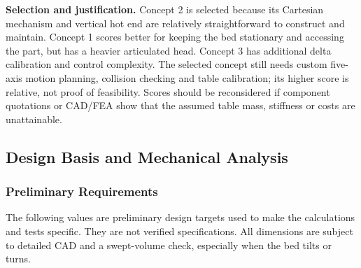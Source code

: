 \documentclass[12pt,a4paper]{article}
\begin{document}
\textbf{Selection and justification.} Concept 2 is selected because its Cartesian mechanism and vertical
  hot end are relatively straightforward to construct and maintain. Concept 1 scores better for keeping
  the bed stationary and accessing the part, but has a heavier articulated head. Concept 3 has additional
  delta calibration and control complexity. The selected concept still needs custom five-axis motion
  planning, collision checking and table calibration; its higher score is relative, not proof of
  feasibility. Scores should be reconsidered if component quotations or CAD/FEA show that the assumed
  table mass, stiffness or costs are unattainable.

\subsection{Design Basis and Mechanical Analysis}\label{design-basis-and-mechanical-analysis}

\subsubsection{Preliminary Requirements}\label{preliminary-requirements}

The following values are preliminary design targets used to make the calculations and tests specific.
  They are not verified specifications. All dimensions are subject to detailed CAD and a swept-volume
  check, especially when the bed tilts or turns.
\end{document}
